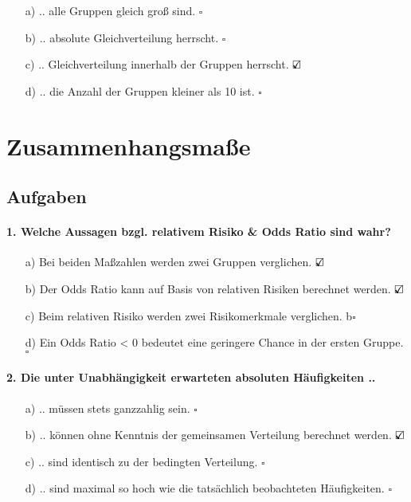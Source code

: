 \documentclass[a4paper]{article}
\begin{document}
\begin{itemize}
    \item[a)] .. alle Gruppen gleich groß sind. \hfill $\square$
    \item[b)] .. absolute Gleichverteilung herrscht. \hfill $\square$
    \item[c)] .. Gleichverteilung innerhalb der Gruppen herrscht. \hfill $\text{\rlap{$\checkmark$}}\square$
    \item[d)] .. die Anzahl der Gruppen kleiner als 10 ist. \hfill $\square$
\end{itemize}


\clearpage


\section{Zusammenhangsmaße}\label{chap:zshg}

\subsection{Aufgaben}

\paragraph{1. Welche Aussagen bzgl. relativem Risiko \& Odds Ratio sind wahr?}

\begin{itemize}
    \item[a)] Bei beiden Maßzahlen werden zwei Gruppen verglichen. \hfill $\text{\rlap{$\checkmark$}}\square$
    \item[b)] Der Odds Ratio kann auf Basis von relativen Risiken berechnet werden. \hfill $\text{\rlap{$\checkmark$}}\square$
    \item[c)] Beim relativen Risiko werden zwei Risikomerkmale verglichen. b\hfill $\square$
    \item[d)] Ein Odds Ratio < 0 bedeutet eine geringere Chance in der ersten Gruppe. \hfill $\square$
\end{itemize}

\paragraph{2. Die unter Unabhängigkeit erwarteten absoluten Häufigkeiten ..}

\begin{itemize}
    \item[a)] .. müssen stets ganzzahlig sein. \hfill $\square$
    \item[b)] .. können ohne Kenntnis der gemeinsamen Verteilung berechnet werden. \hfill $\text{\rlap{$\checkmark$}}\square$
    \item[c)] .. sind identisch zu der bedingten Verteilung. \hfill $\square$
    \item[d)] .. sind maximal so hoch wie die tatsächlich beobachteten Häufigkeiten. \hfill $\square$
\end{itemize}
\end{document}
